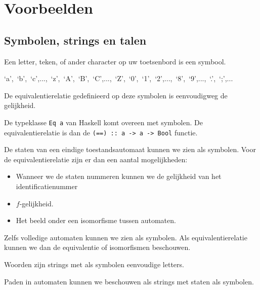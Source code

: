 \documentclass[main.tex]{subfiles}
\begin{document}
\chapter{Voorbeelden}
\label{cha:voorbeelden}

\section{Symbolen, strings en talen}
\label{sec:symbolen-strings-talen}

\begin{vb}
  Een letter, teken, of ander character op uw toetsenbord is een symbool.
  \begin{center}
  `a',\ `b',\ `c',...,\ `z',\ `A',\ `B',\ `C',...,\ `Z',\ `0',\ `1',\ `2',...,\ `8',\ `9',...,\ `.',\ `;',...
  \end{center}
  De equivalentierelatie gedefinieerd op deze symbolen is eenvoudigweg de gelijkheid.
\end{vb}

\begin{vb}
  De typeklasse \texttt{Eq a} van Haskell komt overeen met symbolen.
  De equivalentierelatie is dan de \texttt{(==) :: a -\textgreater\ a -\textgreater\ Bool} functie.
\end{vb}

\begin{vb}
  De staten van een eindige toestandsautomaat kunnen we zien als symbolen.
  Voor de equivalentierelatie zijn er dan een aantal mogelijkheden:
  \begin{itemize}
  \item Wanneer we de staten nummeren kunnen we de gelijkheid van het identificatienummer
  \item $f$-gelijkheid.
  \item Het beeld onder een isomorfisme tussen automaten.
  \end{itemize}
\end{vb}

\begin{vb}
  Zelfs volledige automaten kunnen we zien als symbolen.
  Als equivalentierelatie kunnen we dan de equivalentie of isomorfismen beschouwen.
\end{vb}

\begin{vb}
  Woorden zijn strings met als symbolen eenvoudige letters.
\end{vb}

\begin{vb}
  Paden in automaten kunnen we beschouwen als strings met staten als symbolen.
\end{vb}
\end{document}
